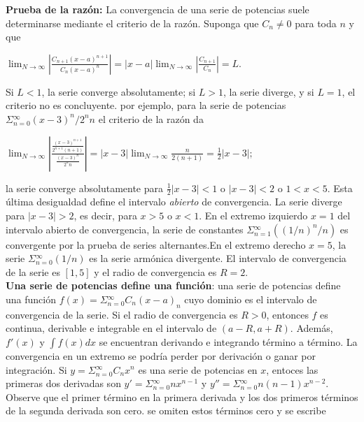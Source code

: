 \documentclass[12pt,letterpaper,oneside]{article}
\begin{document}
  \textbf{Prueba de la razón:} La convergencia de una serie de potencias suele determinarse mediante el criterio de la razón. Suponga que $C_n \neq 0$ para toda $n$ y que\\
\begin{center}
$\displaystyle\lim_{N \to \infty} \left| \frac{C_{n+1}(x-a)^{n+1}}{C_n(x-a)^n} \right|=|x-a| \displaystyle\lim_{N \to \infty} \left| \frac{C_{n+1}}{C_n} \right| = L.$
\end{center}
Si $L<1$, la serie converge absolutamente; si $L>1$, la serie diverge, y si $L = 1$, el criterio no es concluyente. por ejemplo, para la serie de potencias $\Sigma{^\infty_{n=0}} (x - 3)^n/2^nn$ el criterio de la razón da\\
\begin{center}
$\displaystyle\lim_{N \to \infty} \left| \frac{\frac{(x-3)^{n+1}}{2^{n+1}(n+1)}} {\frac{(x-3)^n}{2^nn}} \right| =|x-3|  \displaystyle\lim_{N \to \infty} \frac{n}{2(n+1)}= \frac{1}{2}  |x-3|;$\\
\end{center}
  la serie converge absolutamente para $\frac{1}{2} |x-3|<1$  o $|x-3|<2$ o $1<x<5$. Esta última desigualdad define el intervalo \textit{abierto} de convergencia. La serie diverge para $|x-3|>2$, es decir, para $x>5$ o $x<1$. En el extremo izquierdo $x=1$ del intervalo abierto de convergencia, la serie de constantes $\Sigma{^\infty_{n=1}} ((1/n)^n/n)$ es convergente por la prueba de series alternantes.En el extremo derecho $x = 5$, la serie $\Sigma{^\infty_{n=0}} (1/n)$ es la serie armónica divergente. El intervalo de convergencia de la serie es $[1, 5]$ y el radio de convergencia es $R = 2$.\vspace{0.3cm}\\
  \textbf{Una serie de potencias define una función}: una serie de potencias define una función $f(x)= \Sigma{^\infty_{n=0}} C_n (x - a)_n$ cuyo dominio es el intervalo de convergencia de la serie. Si el radio de convergencia es $R>0$, entonces $f$ es continua, derivable e integrable en el intervalo de $(a - R, a + R)$. Además, $f'(x)$ y $\int f(x)dx$ se encuentran derivando e integrando término a término. La convergencia en un extremo se podría perder por derivación o ganar por integración. Si $y= \Sigma{^\infty_{n=0}} C_n x^n$ es una serie de potencias en $x$, entoces las primeras dos derivadas son $y'=   \Sigma{^\infty_{n=0}} nx ^ { n - 1 }$ y $y''=  \Sigma{^\infty_{n=0}} n ( n - 1 )x^{n-2}$. Observe que el primer término en la primera derivada y los dos primeros términos de la segunda derivada son cero. se omiten estos términos cero y se escribe\\
\end{document}
